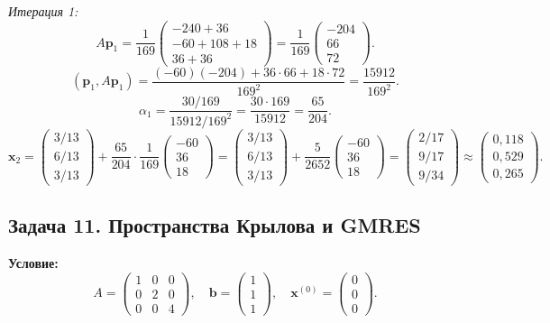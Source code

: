 \documentclass{article}
\begin{document}
\textit{Итерация 1:}
$$A\textbf{p}_1 = \frac{1}{169}\begin{pmatrix} -240+36 \\ -60+108+18 \\ 36+36 \end{pmatrix} = \frac{1}{169}\begin{pmatrix} -204 \\ 66 \\ 72 \end{pmatrix}.$$
$$(\textbf{p}_1, A\textbf{p}_1) = \frac{(-60)(-204) + 36\cdot 66 + 18\cdot 72}{169^2} = \frac{15912}{169^2}.$$
$$\alpha_1 = \frac{30/169}{15912/169^2} = \frac{30\cdot 169}{15912} = \frac{65}{204}.$$
$$\textbf{x}_2 = \begin{pmatrix} 3/13 \\ 6/13 \\ 3/13 \end{pmatrix} + \frac{65}{204}\cdot\frac{1}{169}\begin{pmatrix} -60 \\ 36 \\ 18 \end{pmatrix} = \begin{pmatrix} 3/13 \\ 6/13 \\ 3/13 \end{pmatrix} + \frac{5}{2652}\begin{pmatrix} -60 \\ 36 \\ 18 \end{pmatrix} = \begin{pmatrix} 2/17 \\ 9/17 \\ 9/34 \end{pmatrix} \approx \begin{pmatrix} 0,118 \\ 0,529 \\ 0,265 \end{pmatrix}.$$


\subsection*{Задача 11. Пространства Крылова и GMRES}
\textbf{Условие:}
$$
A = \begin{pmatrix} 1 & 0 & 0 \\ 0 & 2 & 0 \\ 0 & 0 & 4 \end{pmatrix}, \quad 
\textbf{b} = \begin{pmatrix} 1 \\ 1 \\ 1 \end{pmatrix}, \quad 
\textbf{x}^{(0)} = \begin{pmatrix} 0 \\ 0 \\ 0 \end{pmatrix}.
$$
\end{document}
